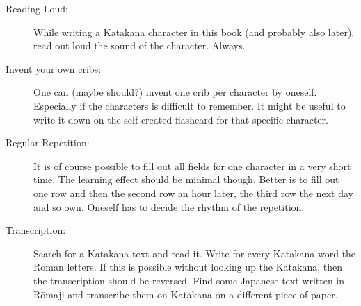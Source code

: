 \begin{description}

\item[Reading Loud:] While writing a Katakana character in this book (and
probably also later), read out loud the sound of the character. Always. 

\item[Invent your own cribs:] One can (maybe should?) invent one crib per
character by oneself. Especially if the characters is difficult to remember. It
might be useful to write it down on the self created flashcard for that
specific character.

\item[Regular Repetition:] It is of course possible to fill out all fields
for one character in a very short time. The learning effect should be minimal
though. Better is to fill out one row and then the second row an hour later,
the third row the next day and so own. Oneself has to decide the rhythm of
the repetition. 

\item[Transcription:]  Search for a  Katakana text and read it. Write for every
Katakana word the Roman letters. If this is possible without looking up the
Katakana, then the transcription should be reversed. Find some Japanese text
written in Rōmaji and transcribe them on Katakana on a different piece of
paper. 

\end{description}

\newpage








